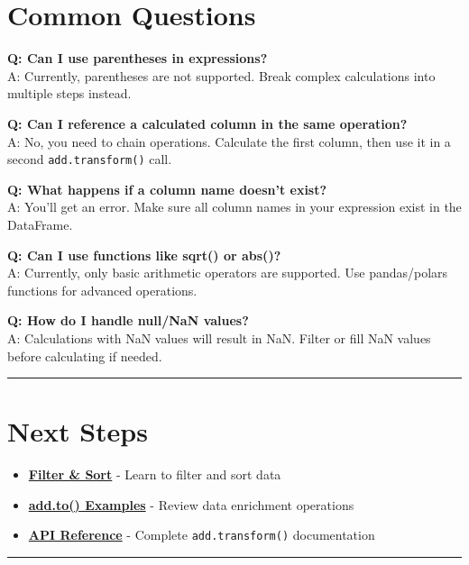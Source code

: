 \documentclass[
  letterpaper,
]{scrbook}
\providecommand{\tightlist}{%
  \setlength{\itemsep}{0pt}\setlength{\parskip}{0pt}}
\begin{document}
\section{Common Questions}\label{common-questions-5}

\textbf{Q: Can I use parentheses in expressions?}\\
A: Currently, parentheses are not supported. Break complex calculations
into multiple steps instead.

\textbf{Q: Can I reference a calculated column in the same operation?}\\
A: No, you need to chain operations. Calculate the first column, then
use it in a second \texttt{add.transform()} call.

\textbf{Q: What happens if a column name doesn't exist?}\\
A: You'll get an error. Make sure all column names in your expression
exist in the DataFrame.

\textbf{Q: Can I use functions like sqrt() or abs()?}\\
A: Currently, only basic arithmetic operators are supported. Use
pandas/polars functions for advanced operations.

\textbf{Q: How do I handle null/NaN values?}\\
A: Calculations with NaN values will result in NaN. Filter or fill NaN
values before calculating if needed.

\begin{center}\rule{0.5\linewidth}{0.5pt}\end{center}

\section{Next Steps}\label{next-steps-7}

\begin{itemize}
\tightlist
\item
  \textbf{\href{examples-transform-02-filter-sort.html}{Filter \& Sort}}
  - Learn to filter and sort data
\item
  \textbf{\href{examples-to-01-basic.html}{add.to() Examples}} - Review
  data enrichment operations
\item
  \textbf{\href{reference-transform.html}{API Reference}} - Complete
  \texttt{add.transform()} documentation
\end{itemize}

\begin{center}\rule{0.5\linewidth}{0.5pt}\end{center}
\end{document}
